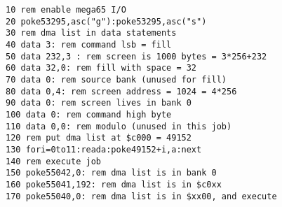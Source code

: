 \begin{tcolorbox}[colback=black,coltext=white]
\verbatimfont{\codefont}
\begin{verbatim}
10 rem enable mega65 I/O
20 poke53295,asc("g"):poke53295,asc("s")
30 rem dma list in data statements
40 data 3: rem command lsb = fill
50 data 232,3 : rem screen is 1000 bytes = 3*256+232
60 data 32,0: rem fill with space = 32
70 data 0: rem source bank (unused for fill)
80 data 0,4: rem screen address = 1024 = 4*256
90 data 0: rem screen lives in bank 0
100 data 0: rem command high byte
110 data 0,0: rem modulo (unused in this job)
120 rem put dma list at $c000 = 49152
130 fori=0to11:reada:poke49152+i,a:next
140 rem execute job
150 poke55042,0: rem dma list is in bank 0
160 poke55041,192: rem dma list is in $c0xx
170 poke55040,0: rem dma list is in $xx00, and execute
\end{verbatim}
\end{tcolorbox}

